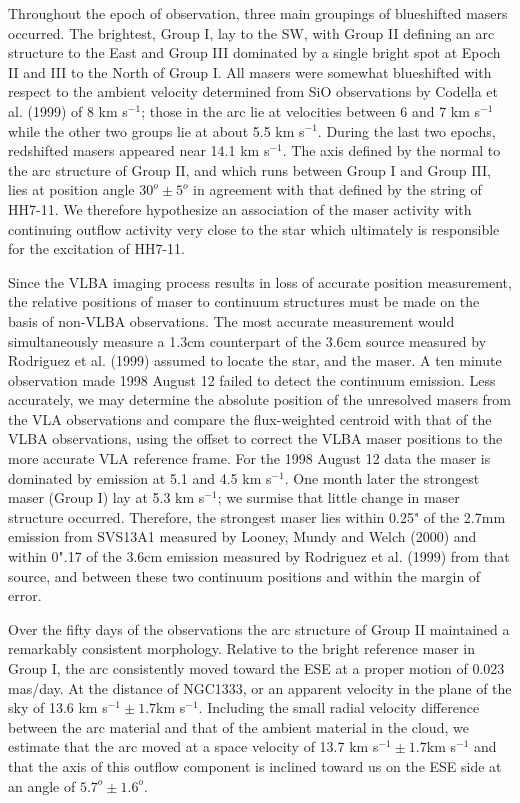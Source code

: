	Throughout the epoch of observation, three main groupings of blueshifted masers occurred. The brightest, Group I, lay to the SW, with Group II defining an arc structure  to the East and Group III dominated by a single bright spot at Epoch II and III to the North of Group I.  All masers were somewhat blueshifted with respect to the ambient velocity determined from SiO observations by Codella et al. (1999) of 8 km s$^{-1}$; those in the arc lie at velocities between 6 and 7 km s$^{-1}$ while the other two groups lie at about  5.5 km s$^{-1}$.  During the last two epochs, redshifted masers appeared near 14.1 km s$^{-1}$.  The axis defined by the normal to the arc structure of Group II, and which runs between Group I and Group III, lies at position angle $30^o \pm  5^o$ in agreement with that defined by the string of HH7-11.  We therefore hypothesize an association of the maser activity with continuing  outflow activity very close to the star which ultimately is responsible for the excitation of HH7-11.

	Since the VLBA imaging process results in loss of accurate position measurement, the relative positions of maser to continuum structures must be made on the basis of non-VLBA observations.  The most accurate measurement would simultaneously measure a 1.3cm counterpart of the 3.6cm source measured by Rodriguez et al. (1999) assumed to locate the star, and the maser. A ten minute observation made 1998 August 12 failed to detect the continuum emission.  Less accurately, we may determine the absolute position of the unresolved masers from the VLA observations and compare the flux-weighted centroid with that of the VLBA observations, using the offset to correct the VLBA maser positions to the more accurate VLA reference frame. For the 1998 August 12 data the maser is dominated by emission at 5.1 and 4.5 km s$^{-1}$.  One month later the strongest maser (Group I) lay at 5.3 km s$^{-1}$; we surmise that little change in maser structure occurred.  Therefore, the strongest maser lies within 0.25" of the 2.7mm emission from SVS13A1 measured by Looney, Mundy and Welch (2000) and within 0".17 of the 3.6cm emission measured by Rodriguez et al. (1999) from that source, and between these two continuum positions and within the margin of error.

	Over the fifty days of the observations the arc structure of Group II maintained a remarkably consistent morphology.  Relative to the bright reference maser in Group I, the arc consistently moved toward the ESE at a proper motion of 0.023 mas/day.  At the distance of NGC1333, or an apparent velocity in the plane of the sky of 13.6 km s$^{-1} \pm  1.7$km s$^{-1}$.  Including the small radial velocity difference between the arc material and that of the ambient material in the cloud, we estimate that the arc moved at a space velocity of 13.7 km s$^{-1} \pm  1.7$km s$^{-1}$ and that the axis of this outflow component is inclined toward us on the ESE side at an angle of $5.7^o \pm 1.6^o$.

